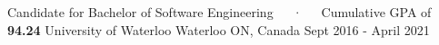 
\begin{cventries}

\vspace{0.5mm}

\cventry
    {Candidate for Bachelor of Software Engineering~~~·~~~Cumulative GPA of \textbf{94.24}} %
    {University of Waterloo} %
    {Waterloo ON, Canada} %
    {Sept 2016 - April 2021} %
    {
      \begin{cvitems} %
      \end{cvitems}
    }

\end{cventries}
